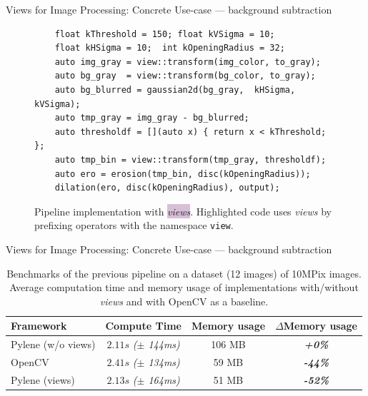 \documentclass[12pt,aspectratio=169]{beamer}
\begin{document}
\newcommand{\mystd}[1]{{\itshape(\(\pm\) #1)}}
\newcommand{\mydelta}[1]{{\itshape\bfseries #1\%}}

\begin{frame}[fragile]{Views for Image Processing: Concrete Use-case --- background subtraction}
  \begin{figure}
    \begin{verbatim}
    float kThreshold = 150; float kVSigma = 10;
    float kHSigma = 10;  int kOpeningRadius = 32;
    auto img_gray = view::transform(img_color, to_gray);
    auto bg_gray  = view::transform(bg_color, to_gray);
    auto bg_blurred = gaussian2d(bg_gray,  kHSigma, kVSigma);
    auto tmp_gray = img_gray - bg_blurred;
    auto thresholdf = [](auto x) { return x < kThreshold; };
    auto tmp_bin = view::transform(tmp_gray, thresholdf);
    auto ero = erosion(tmp_bin, disc(kOpeningRadius));
    dilation(ero, disc(kOpeningRadius), output);
    \end{verbatim}
    \caption{Pipeline implementation with \colorbox{thistle}{\emph{views}}. Highlighted code uses \emph{views} by
      prefixing operators with the namespace \texttt{view}.}
    \label{fig:view.comp.sub_bg.view_code}
  \end{figure}
\end{frame}

\begin{frame}[fragile]{Views for Image Processing: Concrete Use-case --- background subtraction}
  \begin{table}
    \centering
    \begin{tabular}{l|ccc}
      \toprule
      Framework          & Compute Time            & Memory usage & \(\Delta{}\)Memory usage \\ \midrule
      Pylene (w/o views) & \(2.11s\) \mystd{144ms} & 106 MB       & \mydelta{+0}             \\
      OpenCV             & \(2.41s\) \mystd{134ms} & 59 MB        & \mydelta{-44}            \\
      Pylene (views)     & \(2.13s\) \mystd{164ms} & 51 MB        & \mydelta{-52}            \\
      \bottomrule
    \end{tabular}
    \caption{Benchmarks of the previous pipeline on a dataset (12 images) of 10MPix images. Average
      computation time and memory usage of implementations with/without \emph{views} and with OpenCV as a baseline.}
    \label{table:views.perf}
  \end{table}
\end{frame}
\end{document}
